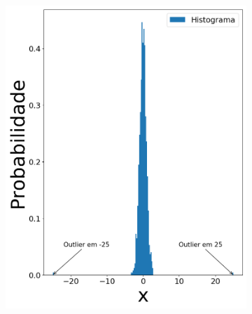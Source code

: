 \begin{figure}[H]
\begin{subfigure}[b]{0.27\textwidth}
		\includegraphics[width=\linewidth]{./figuras/datanormal_25}
		\caption{}
		\label{fig:randn_out}
	\end{subfigure}
	\hfill
	\begin{subfigure}[b]{0.27\textwidth}
		\centering 

\end{subfigure}
\end{figure}
